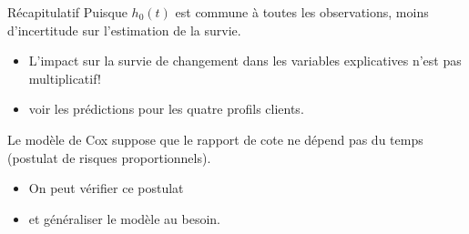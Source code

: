 \documentclass[
  ignorenonframetext,
]{beamer}
\providecommand{\tightlist}{%
  \setlength{\itemsep}{0pt}\setlength{\parskip}{0pt}}\usepackage{longtable,booktabs,array}
\begin{document}
\begin{frame}{Récapitulatif}
\protect\hypertarget{ruxe9capitulatif-6}{}
Puisque \(h_0(t)\) est commune à toutes les observations, moins
d'incertitude sur l'estimation de la survie.

\begin{itemize}
\tightlist
\item
  L'impact sur la survie de changement dans les variables explicatives
  n'est pas multiplicatif!
\item
  voir les prédictions pour les quatre profils clients.
\end{itemize}

Le modèle de Cox suppose que le rapport de cote ne dépend pas du temps
(postulat de risques proportionnels).

\begin{itemize}
\tightlist
\item
  On peut vérifier ce postulat
\item
  et généraliser le modèle au besoin.
\end{itemize}
\end{frame}
\end{document}
